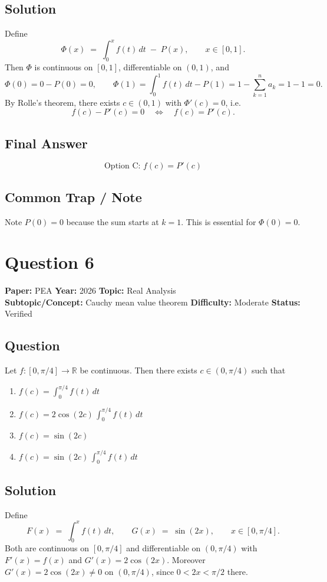 \documentclass[11pt]{article}
\begin{document}
\subsection*{Solution}
Define
\[
\Phi(x) \;=\; \int_0^x f(t)\,dt \;-\; P(x), \qquad x \in [0,1].
\]
Then $\Phi$ is continuous on $[0,1]$, differentiable on $(0,1)$, and
\[
\Phi(0) = 0 - P(0) = 0, \qquad
\Phi(1) = \int_0^1 f(t)\,dt - P(1) = 1 - \sum_{k=1}^n a_k = 1 - 1 = 0.
\]
By Rolle's theorem, there exists $c \in (0,1)$ with $\Phi'(c) = 0$, i.e.
\[
f(c) - P'(c) = 0 \quad\Longleftrightarrow\quad f(c) = P'(c).
\]

\subsection*{Final Answer}
\[
\boxed{\text{Option C: } f(c) = P'(c)}
\]

\subsection*{Common Trap / Note}
Note $P(0)=0$ because the sum starts at $k=1$. This is essential for $\Phi(0)=0$.

\section*{Question 6}
\textbf{Paper:} PEA \quad \textbf{Year:} 2026 \quad \textbf{Topic:} Real Analysis \\
\textbf{Subtopic/Concept:} Cauchy mean value theorem \quad
\textbf{Difficulty:} Moderate \quad \textbf{Status:} Verified

\subsection*{Question}
Let $f:[0,\pi/4]\to\mathbb{R}$ be continuous. Then there exists $c\in(0,\pi/4)$ such that
\begin{enumerate}[label=(\Alph*)]
\item $f(c) = \int_0^{\pi/4} f(t)\,dt$
\item $f(c) = 2\cos(2c)\,\int_0^{\pi/4} f(t)\,dt$
\item $f(c) = \sin(2c)$
\item $f(c) = \sin(2c)\,\int_0^{\pi/4} f(t)\,dt$
\end{enumerate}

\subsection*{Solution}
Define
\[
F(x) \;=\; \int_0^x f(t)\,dt, \qquad G(x) \;=\; \sin(2x), \qquad x \in [0,\pi/4].
\]
Both are continuous on $[0,\pi/4]$ and differentiable on $(0,\pi/4)$ with
$F'(x) = f(x)$ and $G'(x) = 2\cos(2x)$. Moreover $G'(x) = 2\cos(2x) \neq 0$ on
$(0,\pi/4)$, since $0 < 2x < \pi/2$ there.
\end{document}
